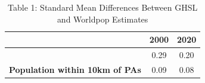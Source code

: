 \begin{table}[t]
\caption*{
{\fontsize{10}{13}\selectfont  Table 1: Standard Mean Differences Between GHSL and Worldpop Estimates\fontsize{8}{10}\selectfont }
} 
\fontsize{8.0pt}{10.0pt}\selectfont
\begin{tabular*}{\linewidth}{@{\extracolsep{\fill}}ccc}
\toprule
 & {\bfseries 2000} & {\bfseries 2020} \\ 
\midrule\addlinespace[2.5pt]
{\bfseries Population within PAs} & 0.29 & 0.20 \\ 
{\bfseries Population within 10km of PAs} & 0.09 & 0.08 \\ 
\bottomrule
\end{tabular*}
\end{table}

